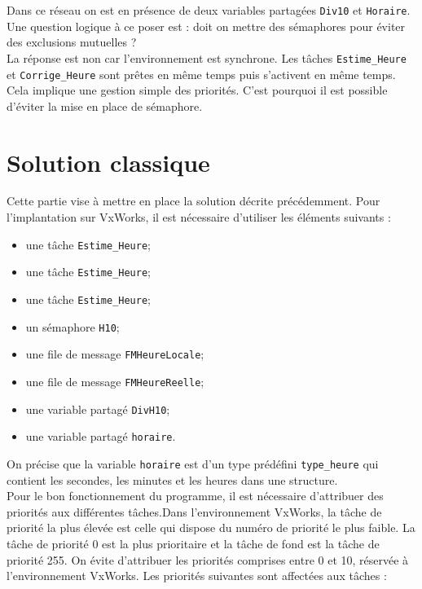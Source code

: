 \documentclass[french]{article}
\begin{document}
	Dans ce réseau on est en présence de deux variables partagées \texttt{Div10} et \texttt{Horaire}. Une question logique à ce poser est : doit on mettre des sémaphores pour éviter des exclusions mutuelles ?\\
	
	La réponse est non car l'environnement est synchrone. Les tâches \texttt{Estime\_Heure} et \texttt{Corrige\_Heure} sont prêtes en même temps puis s'activent en même temps. Cela implique une gestion simple des priorités. C'est pourquoi il est possible d'éviter la mise en place de sémaphore.\\
	
	
	
	\section{Solution classique}
	
	Cette partie vise à mettre en place la solution décrite précédemment. Pour l'implantation sur VxWorks, il est nécessaire d'utiliser les éléments suivants :
	\begin{itemize}
		\item une tâche \texttt{Estime\_Heure};
		\item une tâche \texttt{Estime\_Heure};
		\item une tâche \texttt{Estime\_Heure};
		\item un sémaphore \texttt{H10};
		\item une file de message \texttt{FMHeureLocale};
		\item une file de message \texttt{FMHeureReelle};
		\item une variable partagé \texttt{DivH10};
		\item une variable partagé \texttt{horaire}.		
	\end{itemize}
	
	On précise que la variable \texttt{horaire} est d'un type prédéfini \texttt{type\_heure} qui contient les secondes, les minutes et les heures dans une structure.\\
	
	Pour le bon fonctionnement du programme, il est nécessaire d'attribuer des priorités aux différentes tâches.Dans l’environnement	VxWorks, la tâche de priorité la plus élevée est celle qui dispose du numéro de priorité le plus faible. La tâche de priorité 0 est la plus prioritaire et la tâche de fond est la tâche de priorité 255. On évite d’attribuer les priorités comprises entre 0 et 10, réservée à l’environnement VxWorks. Les priorités suivantes sont affectées aux tâches :
	
\end{document}
